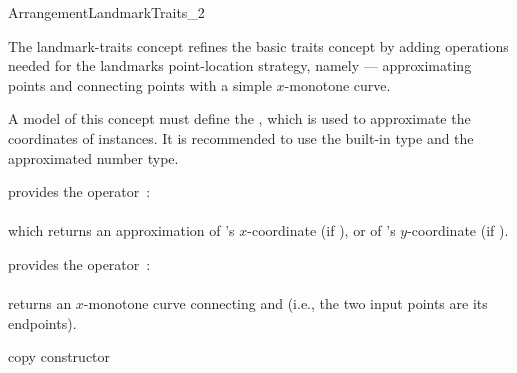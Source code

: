  
\begin{ccRefConcept}{ArrangementLandmarkTraits_2}

\ccDefinition

The landmark-traits concept refines the basic traits concept by adding
operations needed for the landmarks point-location strategy, namely ---
approximating points and connecting points with a simple $x$-monotone
curve.

A model of this concept must define the , which
is used to approximate the coordinates of  instances. It is
recommended to use the built-in  type and the approximated number
type.

\ccRefines
{}

\ccTypes



{provides the operator~: \\
  \\
 which returns an approximation of 's $x$-coordinate (if ),
 or of 's $y$-coordinate (if ).}

{provides the operator~: \\
  \\
 returns an $x$-monotone curve connecting  and  (i.e., the
 two input points are its endpoints).}

\ccCreation
{}

\ccGlue
{}
{copy constructor}
\ccGlue
{}


\end{ccRefConcept}
